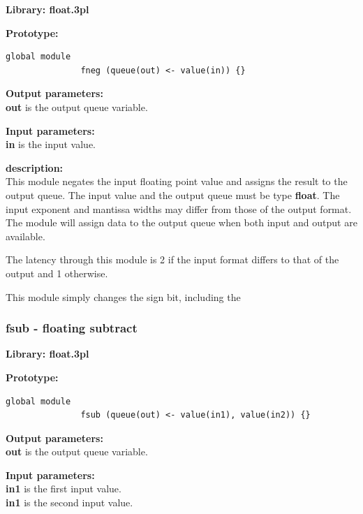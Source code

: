             {\bf Library: float.3pl}

            {\bf Prototype:} \\
            \vsp
            \begin{lstlisting}[gobble=12, language=threepl]
               global module
               fneg (queue(out) <- value(in)) {}
            \end{lstlisting}

            {\bf Output parameters:} \\
            {\bf out} is the output queue variable.

            {\bf Input parameters:} \\
            {\bf in} is the input value.

            {\bf description:} \\
            This module negates the input floating point value and assigns the
            result to the output queue. The input value and the output queue must
            be type {\bf float}. The input exponent and mantissa widths may
            differ from those of the output format. The module will assign data
            to the output queue when both input and output are available.

            The latency through this module is 2 if the input format
            differs to that of the output and 1 otherwise.
            
            This module simply changes the sign bit, including the


        \subsubsection{fsub - floating subtract}\label{sec:lmfsub}

            {\bf Library: float.3pl}

            {\bf Prototype:} \\
            \vsp
            \begin{lstlisting}[gobble=12, language=threepl]
               global module
               fsub (queue(out) <- value(in1), value(in2)) {}
            \end{lstlisting}

            {\bf Output parameters:} \\
            {\bf out} is the output queue variable.

            {\bf Input parameters:} \\
            {\bf in1} is the first input value. \\
            {\bf in1} is the second input value.

